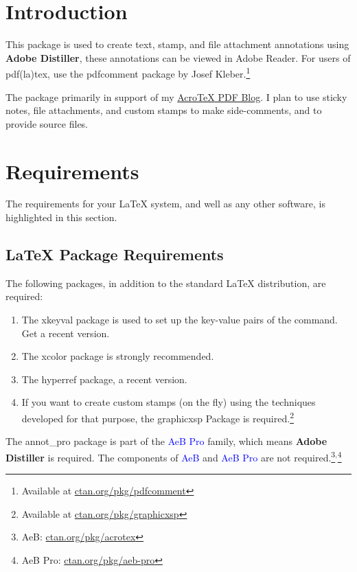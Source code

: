 \documentclass[12pt]{article}
\begin{document}
\maketitle

\tableofcontents
{}

\section{Introduction}

This package is used to create text, stamp, and file attachment
annotations using \textbf{Adobe Distiller}, these annotations can be
viewed in Adobe Reader. For users of \textsf{pdf(la)tex}, use the
\textsf{pdfcomment} package by Josef Kleber.\footnote{Available at \href{http://ctan.org/pkg/pdfcomment}{ctan.org/pkg/pdfcomment}}

The package primarily in support of my \href{http://www.math.uakron.edu/~dpstory}
{{Acro\negthinspace\TeX} PDF Blog}. I plan to use sticky notes, file attachments, and
custom stamps to make side-comments, and to provide source files.

\section{Requirements}

The requirements for your {\LaTeX} system, and well as any other
software, is highlighted in this section.

\subsection{{\LaTeX} Package Requirements}

The following packages, in addition to the standard {\LaTeX}
distribution, are required:
\begin{enumerate}
  \item The \textsf{xkeyval} package is used to set up the key-value
      pairs of the  command. Get a recent version.
  \item The \textsf{xcolor} package is strongly recommended.
  \item The \textsf{hyperref} package, a recent version.
  \item If you want to create custom stamps (on the fly) using the techniques
      developed for that purpose, the \textsf{graphicxsp} Package is required.\footnote
      {Available at \href{http://ctan.org/pkg/graphicxsp}{ctan.org/pkg/graphicxsp}}
\end{enumerate}
The \textsf{annot\_pro} package is part of the \textcolor{blue}{AeB
Pro} family, which means \textbf{Adobe Distiller} is required. The
components of \textcolor{blue}{AeB} and \textcolor{blue}{AeB Pro}
are not required.\footnote{AeB: \href{http://ctan.org/pkg/acrotex}{ctan.org/pkg/acrotex}}${}^{,}$\footnote{AeB Pro:
\href{http://ctan.org/pkg/aeb-pro}{ctan.org/pkg/aeb-pro}}
\end{document}

